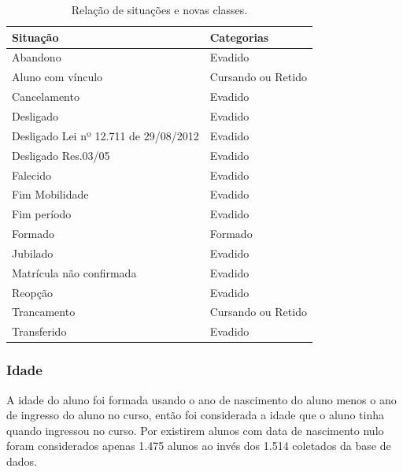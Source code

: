 \documentclass[diss,capa]{texufpel}
\begin{document}
\begin{table}[htbp]
\begin{center}
\caption{Relação de situações e novas classes.}
\label{tab:situacoes-alunos-classes}
\begin{tabular}{p{10cm}|p{5cm}} \hline
Situação                                & Categorias         \\ \hline
Abandono                                & Evadido            \\
Aluno com vínculo                       & Cursando ou Retido \\
Cancelamento                            & Evadido            \\
Desligado                               & Evadido            \\
Desligado Lei nº 12.711 de 29/08/2012   & Evadido            \\
Desligado Res.03/05                     & Evadido            \\
Falecido                                & Evadido            \\
Fim Mobilidade                          & Evadido            \\
Fim período                             & Evadido            \\
Formado                                 & Formado            \\
Jubilado                                & Evadido            \\
Matrícula não confirmada                & Evadido            \\
Reopção                                 & Evadido            \\
Trancamento                             & Cursando ou Retido \\
Transferido                             & Evadido            \\ \hline
\end{tabular}
\end{center}
\end{table}

\subsubsection{Idade}

A idade do aluno foi formada usando o ano de nascimento do aluno menos o ano de ingresso do aluno no curso, então foi considerada a idade que o aluno tinha quando ingressou no curso.
Por existirem alunos com data de nascimento nulo foram considerados apenas 1.475 alunos ao invés dos 1.514 coletados da base de dados.
\end{document}
